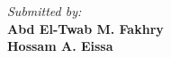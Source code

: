 {
  \centering
  \Large
  \textsl{Submitted by:} \\
  \bfseries
  {
    Abd El-Twab M. Fakhry \\
    Hossam A. Eissa
  }
  \par
}